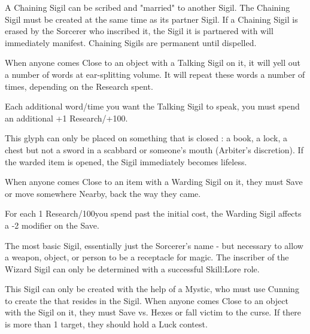 {\large{}\normalsize




A Chaining Sigil can be scribed and "married" to another Sigil.  The Chaining Sigil must be created at the same time as its partner Sigil.  If a Chaining Sigil is erased by the Sorcerer who inscribed it, the Sigil it is partnered with will immediately manifest.  Chaining Sigils are permanent until dispelled.


When anyone comes Close to an object with a Talking Sigil on it, it will yell out a number of words at ear-splitting volume.  It will repeat these words a number of times, depending on the Research spent.

Each additional word/time you want the Talking Sigil to speak, you must spend an additional +1 Research/+100\FE.



This glyph can only be placed on something that is closed : a book, a lock, a chest but not a sword in a scabbard or someone's mouth (Arbiter's discretion).  If the warded item is opened, the Sigil immediately becomes lifeless.

When anyone comes Close to an item with a Warding Sigil on it, they must Save or move somewhere Nearby, back the way they came.  

For each 1 Research/100\FE you spend past the initial cost, the Warding Sigil affects a -2 modifier on the Save.



The most basic Sigil, essentially just the Sorcerer's name - but necessary to allow a weapon, object, or person to be a receptacle for magic.  The inscriber of the Wizard Sigil can only be determined with a successful Skill:Lore role.


\large{}\normalsize





This Sigil can only be created with the help of a Mystic, who must use Cunning to create the  that resides in the Sigil.  When anyone comes Close to an object with the Sigil on it, they must Save vs. Hexes or fall victim to the curse. If there is more than 1 target, they should hold a Luck contest.

}
